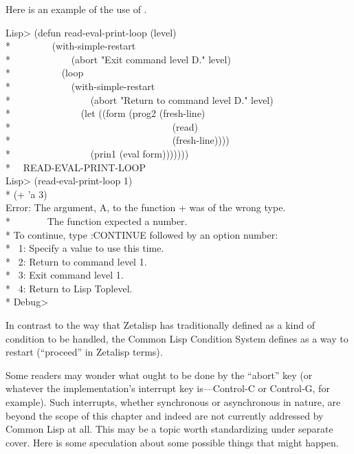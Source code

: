 \begin{defmac}
Here is an example of the use of .
\begin{lisp}
Lisp> (defun read-eval-print-loop (level) \\*
~~~~~~~~(with-simple-restart \\*
~~~~~~~~~~~~(abort "Exit command level {\Xtilde}D." level) \\*
~~~~~~~~~~(loop \\*
~~~~~~~~~~~~(with-simple-restart \\*
~~~~~~~~~~~~~~~~(abort "Return to command level {\Xtilde}D." level) \\*
~~~~~~~~~~~~~~(let ((form (prog2 (fresh-line) \\*
~~~~~~~~~~~~~~~~~~~~~~~~~~~~~~~~~(read) \\*
~~~~~~~~~~~~~~~~~~~~~~~~~~~~~~~~~(fresh-line)))) \\*
~~~~~~~~~~~~~~~~(prin1 (eval form))))))) \\*
~\EV\ READ-EVAL-PRINT-LOOP \\
Lisp> (read-eval-print-loop 1) \\*
(+ 'a 3) \\
Error: The argument, A, to the function + was of the wrong type. \\*
~~~~~~~The function expected a number. \\*
To continue, type :CONTINUE followed by an option number: \\*
~1: Specify a value to use this time. \\*
~2: Return to command level 1. \\*
~3: Exit command level 1. \\*
~4: Return to Lisp Toplevel. \\*
Debug> 
\end{lisp}

\beforenoterule
\begin{incompatibility}
In contrast to the way that Zetalisp has traditionally
  defined  as a kind of condition to be handled,
  the Common Lisp Condition System defines  as a
  way to restart (``proceed'' in Zetalisp terms).
\end{incompatibility}
\betweennoterule
\begin{sideremark}
    Some readers may wonder what ought to be done by the ``abort'' key (or whatever
    the implementation's interrupt key is---Control-C or Control-G, 
    for example). Such interrupts, whether synchronous or asynchronous
    in nature, are beyond the scope of this chapter and indeed are not currently
    addressed by Common Lisp at all. This may be a topic
    worth standardizing under separate cover. Here is some speculation
    about some possible things that might happen.


\end{sideremark}
\end{defmac}
